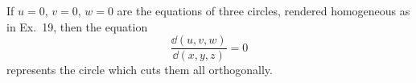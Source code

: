 If $u = 0$, $v = 0$, $w = 0$  are the equations of three circles, rendered
homogeneous as in Ex.~19, then the equation
\[
\frac{\dd(u, v, w)}{\dd(x, y, z)} = 0
\]
represents the circle which cuts them all orthogonally. 


